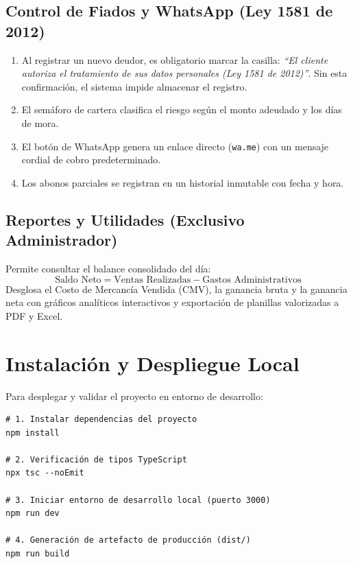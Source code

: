 \documentclass[12pt,a4paper]{article}
\begin{document}
\subsection{Control de Fiados y WhatsApp (Ley 1581 de 2012)}
\begin{enumerate}
    \item Al registrar un nuevo deudor, es obligatorio marcar la casilla: \textit{``El cliente autoriza el tratamiento de sus datos personales (Ley 1581 de 2012)''}. Sin esta confirmación, el sistema impide almacenar el registro.
    \item El semáforo de cartera clasifica el riesgo según el monto adeudado y los días de mora.
    \item El botón de WhatsApp genera un enlace directo (\texttt{wa.me}) con un mensaje cordial de cobro predeterminado.
    \item Los abonos parciales se registran en un historial inmutable con fecha y hora.
\end{enumerate}

\subsection{Reportes y Utilidades (Exclusivo Administrador)}
Permite consultar el balance consolidado del día:
\begin{equation}
    \text{Saldo Neto} = \text{Ventas Realizadas} - \text{Gastos Administrativos}
\end{equation}
Desglosa el Costo de Mercancía Vendida (CMV), la ganancia bruta y la ganancia neta con gráficos analíticos interactivos y exportación de planillas valorizadas a PDF y Excel.

\section{Instalación y Despliegue Local}

Para desplegar y validar el proyecto en entorno de desarrollo:

\begin{verbatim}
# 1. Instalar dependencias del proyecto
npm install

# 2. Verificación de tipos TypeScript
npx tsc --noEmit

# 3. Iniciar entorno de desarrollo local (puerto 3000)
npm run dev

# 4. Generación de artefacto de producción (dist/)
npm run build
\end{verbatim}
\end{document}
